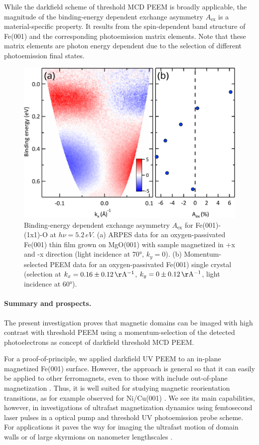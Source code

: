 \documentclass[prl,twocolumn,floatfix]{revtex4-2}
\begin{document}
While the darkfield scheme of threshold MCD PEEM is broadly applicable, the magnitude of the binding-energy dependent exchange asymmetry $A_{\mathrm{ex}}$ is a material-specific property. It results from the spin-dependent band structure of Fe(001) and the corresponding photoemission matrix elements. Note that these matrix elements are photon energy dependent due to the selection of different photoemission final states.

\begin{figure}
    \centering
    \includegraphics[width = 0.9\columnwidth]{Fe001-O_2.pdf}
    \caption{Binding-energy dependent exchange asymmetry $A_{\mathrm{ex}}$ for Fe(001)-(1x1)-O at $h\nu = 5.2\,eV$. (a) ARPES data for an oxygen-passivated Fe(001) thin film grown on MgO(001) with sample magnetized in +x and -x direction (light incidence at 70°, $k_y = 0$). (b) Momentum-selected PEEM data for an oxygen-passivated Fe(001) single crystal (selection at $k_x = \unit[0.16\pm0.12]{\AA^{-1}}$, $k_y = \unit[0\pm0.12]{\AA^{-1}}$, light incidence at 60°). 
    }
    \label{fig:AexContrast}
\end{figure}

\paragraph{Summary and prospects.} The present investigation proves that magnetic domains can be imaged with high contrast with threshold PEEM using a momentum-selection of the detected photoelectrons as concept of darkfield threshold MCD PEEM. 

For a proof-of-principle, we applied darkfield UV PEEM to an in-plane magnetized Fe(001) surface. However, the approach is general so that it can easily be applied to other ferromagnets, even to those with include out-of-plane magnetization \cite{kronseder2011}. Thus, it is well suited for studying magnetic reorientation transitions, as for example observed for Ni/Cu(001) \cite{fukumoto2002,sander2004,nakagawa2006,kronseder2011}. We see its main capabilities, however, in investigations of ultrafast magnetization dynamics using femtosecond laser pulses in a optical pump and threshold UV photoemission probe scheme. For applications it paves the way for imaging the ultrafast motion of domain walls \cite{parkin2008} or of large skyrmions on nanometer lengthscales \cite{goebel2019,jani2021,kern2022}.
\end{document}
